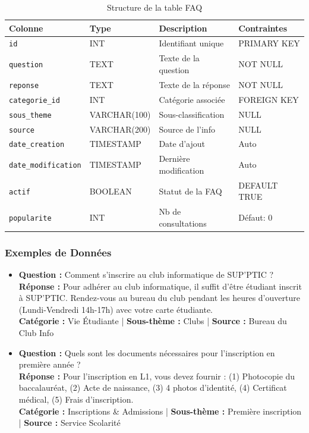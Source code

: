 \documentclass[11pt,a4paper]{article}
\begin{document}
\begin{table}[H]
\centering
\small
\begin{tabular}{|l|l|l|l|}
\hline
\textbf{Colonne} & \textbf{Type} & \textbf{Description} & \textbf{Contraintes} \\
\hline
\texttt{id} & INT & Identifiant unique & PRIMARY KEY \\
\hline
\texttt{question} & TEXT & Texte de la question & NOT NULL \\
\hline
\texttt{reponse} & TEXT & Texte de la réponse & NOT NULL \\
\hline
\texttt{categorie\_id} & INT & Catégorie associée & FOREIGN KEY \\
\hline
\texttt{sous\_theme} & VARCHAR(100) & Sous-classification & NULL \\
\hline
\texttt{source} & VARCHAR(200) & Source de l'info & NULL \\
\hline
\texttt{date\_creation} & TIMESTAMP & Date d'ajout & Auto \\
\hline
\texttt{date\_modification} & TIMESTAMP & Dernière modification & Auto \\
\hline
\texttt{actif} & BOOLEAN & Statut de la FAQ & DEFAULT TRUE \\
\hline
\texttt{popularite} & INT & Nb de consultations & Défaut: 0 \\
\hline
\end{tabular}
\caption{Structure de la table FAQ}
\end{table}

\subsubsection{Exemples de Données}

\begin{exemple}
\begin{itemize}
    \item \textbf{Question :} Comment s'inscrire au club informatique de SUP'PTIC ? \\
    \textbf{Réponse :} Pour adhérer au club informatique, il suffit d'être étudiant inscrit à SUP'PTIC. Rendez-vous au bureau du club pendant les heures d'ouverture (Lundi-Vendredi 14h-17h) avec votre carte étudiante. \\
    \textbf{Catégorie :} Vie Étudiante | \textbf{Sous-thème :} Clubs | \textbf{Source :} Bureau du Club Info
    
    \item \textbf{Question :} Quels sont les documents nécessaires pour l'inscription en première année ? \\
    \textbf{Réponse :} Pour l'inscription en L1, vous devez fournir : (1) Photocopie du baccalauréat, (2) Acte de naissance, (3) 4 photos d'identité, (4) Certificat médical, (5) Frais d'inscription. \\
    \textbf{Catégorie :} Inscriptions \& Admissions | \textbf{Sous-thème :} Première inscription | \textbf{Source :} Service Scolarité
\end{itemize}
\end{exemple}
\end{document}

